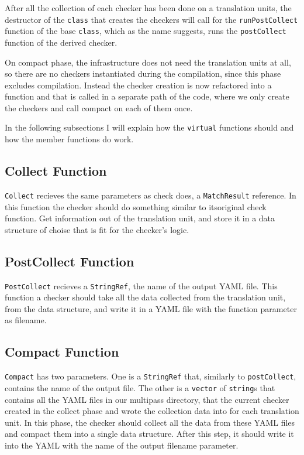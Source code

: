 After all the collection of each checker has been done on a translation units, the destructor of the \lstinline{class} that
creates the checkers will call for the \texttt{runPostCollect} function of the base
\lstinline{class}, which as the name suggests, runs the \texttt{postCollect} function of the derived checker.

On compact phase, the infrastructure does not need the translation units at all, so there are no checkers instantiated during the
compilation, since this phase excludes compilation. Instead the checker creation is now refactored into a function and that is called
in a separate path of the code, where we only create the checkers and call compact on each of them once.

In the following subsections I will explain how the \lstinline{virtual} functions should and how the member functions do work.

\subsection{Collect Function}

\texttt{Collect} recieves the same parameters as check does, a \texttt{MatchResult} reference. In this function the checker should
do something similar to itsoriginal check function. Get information out of the translation unit, and store it in a data
structure of choise that is fit for the checker's logic.

\subsection{PostCollect Function}

\texttt{PostCollect} recieves a \lstinline{StringRef}, the name of the output YAML file. This function a checker should take all the data
collected from the translation unit, from the data structure, and write it in a YAML file with the function parameter as filename.

\subsection{Compact Function}

\texttt{Compact} has two parameters. One is a \lstinline{StringRef} that, similarly to \texttt{postCollect}, contains the
name of the output file.
The other is a \lstinline{vector} of \lstinline{string}s that contains all the YAML files in our multipass directory, that the
current checker created in the collect phase and wrote the collection data into for each translation unit.
In this phase, the checker should collect all the data from these YAML files and compact them into a single data structure. After
this step, it should write it into the YAML with the name of the output filename parameter.

